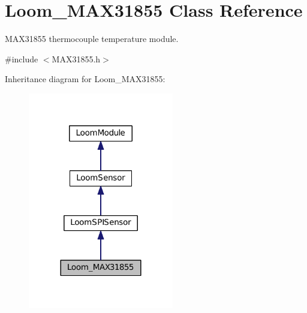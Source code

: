 \hypertarget{class_loom___m_a_x31855}{}\section{Loom\+\_\+\+M\+A\+X31855 Class Reference}
\label{class_loom___m_a_x31855}


M\+A\+X31855 thermocouple temperature module.  




{\ttfamily \#include $<$M\+A\+X31855.\+h$>$}



Inheritance diagram for Loom\+\_\+\+M\+A\+X31855\+:\nopagebreak
\begin{figure}[H]
\begin{center}
\leavevmode
\includegraphics[width=180pt]{class_loom___m_a_x31855__inherit__graph}
\end{center}
\end{figure}
